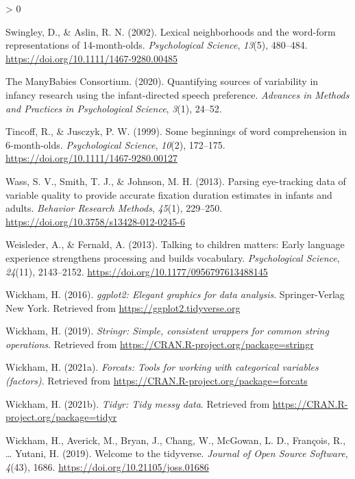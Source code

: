 \documentclass[
  english,
  man,floatsintext]{apa6}
\newlength{\cslhangindent}
\newenvironment{CSLReferences}[2] %
 {%
  \setlength{\parindent}{0pt}
  \ifodd #1 \everypar{\setlength{\hangindent}{\cslhangindent}}\ignorespaces\fi
  \ifnum #2 > 0
  \setlength{\parskip}{#2\baselineskip}
  \fi
 }%
 {}
\begin{document}
\begin{CSLReferences}{1}{0}
\leavevmode\hypertarget{ref-Swingley2002}{}%
Swingley, D., \& Aslin, R. N. (2002). {Lexical neighborhoods and the word-form representations of 14-month-olds}. \emph{Psychological Science}, \emph{13}(5), 480--484. \url{https://doi.org/10.1111/1467-9280.00485}

\leavevmode\hypertarget{ref-manybabies2020}{}%
The ManyBabies Consortium. (2020). {Quantifying sources of variability in infancy research using the infant-directed speech preference}. \emph{Advances in Methods and Practices in Psychological Science}, \emph{3}(1), 24--52.

\leavevmode\hypertarget{ref-Tincoff1999}{}%
Tincoff, R., \& Jusczyk, P. W. (1999). {Some beginnings of word comprehension in 6-month-olds}. \emph{Psychological Science}, \emph{10}(2), 172--175. \url{https://doi.org/10.1111/1467-9280.00127}

\leavevmode\hypertarget{ref-Wass2013}{}%
Wass, S. V., Smith, T. J., \& Johnson, M. H. (2013). {Parsing eye-tracking data of variable quality to provide accurate fixation duration estimates in infants and adults.} \emph{Behavior Research Methods}, \emph{45}(1), 229--250. \url{https://doi.org/10.3758/s13428-012-0245-6}

\leavevmode\hypertarget{ref-Weisleder2013}{}%
Weisleder, A., \& Fernald, A. (2013). {Talking to children matters: Early language experience strengthens processing and builds vocabulary}. \emph{Psychological Science}, \emph{24}(11), 2143--2152. \url{https://doi.org/10.1177/0956797613488145}

\leavevmode\hypertarget{ref-R-ggplot2}{}%
Wickham, H. (2016). \emph{ggplot2: Elegant graphics for data analysis}. Springer-Verlag New York. Retrieved from \url{https://ggplot2.tidyverse.org}

\leavevmode\hypertarget{ref-R-stringr}{}%
Wickham, H. (2019). \emph{Stringr: Simple, consistent wrappers for common string operations}. Retrieved from \url{https://CRAN.R-project.org/package=stringr}

\leavevmode\hypertarget{ref-R-forcats}{}%
Wickham, H. (2021a). \emph{Forcats: Tools for working with categorical variables (factors)}. Retrieved from \url{https://CRAN.R-project.org/package=forcats}

\leavevmode\hypertarget{ref-R-tidyr}{}%
Wickham, H. (2021b). \emph{Tidyr: Tidy messy data}. Retrieved from \url{https://CRAN.R-project.org/package=tidyr}

\leavevmode\hypertarget{ref-R-tidyverse}{}%
Wickham, H., Averick, M., Bryan, J., Chang, W., McGowan, L. D., François, R., \ldots{} Yutani, H. (2019). Welcome to the {tidyverse}. \emph{Journal of Open Source Software}, \emph{4}(43), 1686. \url{https://doi.org/10.21105/joss.01686}


\end{CSLReferences}
\end{document}
